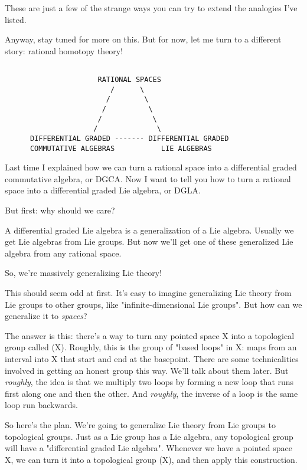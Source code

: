 These are just a few of the strange ways you can try to extend the
analogies I've listed.

Anyway, stay tuned for more on this.  But for now, let me turn to a
different story: rational homotopy theory!


\begin{verbatim}

                      RATIONAL SPACES
                         /      \  
                        /        \  
                       /          \  
                      /            \
                     /              \
      DIFFERENTIAL GRADED ------- DIFFERENTIAL GRADED
      COMMUTATIVE ALGEBRAS           LIE ALGEBRAS
\end{verbatim}
    

Last time I explained how we can turn a rational space into a
differential graded commutative algebra, or DGCA.  Now I want to tell
you how to turn a rational space into a differential graded Lie
algebra, or DGLA.

But first: why should we care?  

A differential graded Lie algebra is a generalization of a Lie
algebra.  Usually we get Lie algebras from Lie groups.  But now
we'll get one of these generalized Lie algebra from any rational
space.  

So, we're massively generalizing Lie theory!

This should seem odd at first.  It's easy to imagine generalizing Lie
theory from Lie groups to other groups, like "infinite-dimensional Lie
groups".  But how can we generalize it to \emph{spaces}?

The answer is this: there's a way to turn any pointed space X into a
topological group called \Omega (X).  Roughly, this is the group of
"based loops" in X: maps from an interval into X that start
and end at the basepoint.  There are some technicalities involved in
getting an honest group this way.  We'll talk about them later.  But
\emph{roughly}, the idea is that we multiply two loops by forming a new
loop that runs first along one and then the other.  And \emph{roughly},
the inverse of a loop is the same loop run backwards.

So here's the plan.  We're going to generalize Lie theory from Lie
groups to topological groups.  Just as a Lie group has a Lie algebra,
any topological group will have a "differential graded Lie algebra".
Whenever we have a pointed space X, we can turn it into a topological
group \Omega (X), and then apply this construction.

